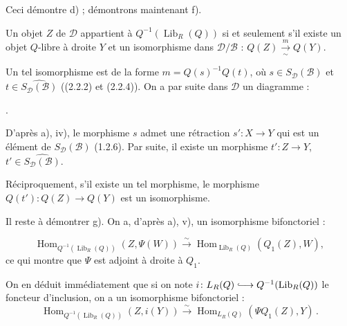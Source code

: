 \clearpage
{}%
\begingroup
\small
\setlength{\parskip}{0pt}%
\setlength{\emergencystretch}{1.5em}%
\setlength{\abovedisplayskip}{3pt plus 1pt minus 1pt}%
\setlength{\belowdisplayskip}{3pt plus 1pt minus 1pt}%

\noindent Ceci démontre d) ; démontrons maintenant f).

Un objet $Z$ de $\mathcal D$ appartient à
$Q^{-1}(\operatorname{Lib}_R(Q))$ si et seulement s'il existe un objet
$Q$-libre à droite $Y$ et un isomorphisme dans $\mathcal D/\mathcal B$ :
$Q(Z)\xrightarrow[\sim]{m}Q(Y)$.

Un tel isomorphisme est de la forme $m=Q(s)^{-1}Q(t)$, où
$s\in S_{\mathcal D}(\mathcal B)$ et
$t\in\widehat{S_{\mathcal D}(\mathcal B)}$ ((2.2.2) et (2.2.4)). On a par
suite dans $\mathcal D$ un diagramme :

\begin{center}
  \quad .
\end{center}

D'après a), iv), le morphisme $s$ admet une rétraction
$s'\colon X\longrightarrow Y$ qui est un élément de
$S_{\mathcal D}(\mathcal B)$ (1.2.6). Par suite, il existe un morphisme
$t'\colon Z\longrightarrow Y$,
$t'\in\widehat{S_{\mathcal D}(\mathcal B)}$.

Réciproquement, s'il existe un tel morphisme, le morphisme
$Q(t')\colon Q(Z)\longrightarrow Q(Y)$ est un isomorphisme.

Il reste à démontrer g). On a, d'après a), v), un isomorphisme
bifonctoriel :

\[
  \operatorname{Hom}_{Q^{-1}(\operatorname{Lib}_R(Q))}(Z,\Psi(W))
  \xrightarrow{\sim}
  \operatorname{Hom}_{\operatorname{Lib}_R(Q)}(Q_1(Z),W),
\]
ce qui montre que $\Psi$ est adjoint à droite à $Q_1$.

On en déduit immédiatement que si on note
$i\colon L_R(Q)\lhook\joinrel\longrightarrow
Q^{-1}(\operatorname{Lib}_R(Q))$ le foncteur d'inclusion, on a un
isomorphisme bifonctoriel :
\[
  \operatorname{Hom}_{Q^{-1}(\operatorname{Lib}_R(Q))}(Z,i(Y))
  \xrightarrow{\sim}
  \operatorname{Hom}_{L_R(Q)}(\Psi Q_1(Z),Y)\, .
\]

